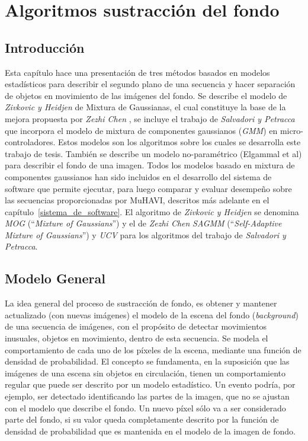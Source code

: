 \chapter{Algoritmos sustracción del fondo}\label{chap:algoritmos}

\section{Introducción}


Esta capítulo hace una presentación de tres métodos basados en modelos estadísticos para describir el segundo plano de una secuencia y hacer separación de objetos en movimiento de las imágenes del fondo. Se describe el modelo de \textit{Zivkovic y Heidjen} \cite{zivkovic_efficient_2006} de Mixtura de Gaussianas, el cual constituye la base de la mejora propuesta por \textit{Zezhi Chen} \cite{chen_vehicle_2012}, se incluye el trabajo de \textit{Salvadori y Petracca} \cite{salvadori_gaussian_2012} que incorpora el modelo de mixtura de componentes gaussianos (\textit{GMM}) en micro-controladores. Estos modelos son los algoritmos sobre los cuales se desarrolla este trabajo de tesis. También se describe un modelo no-paramétrico (Elgammal et al\cite{elgammal_nonparametricmodel_2000}) para describir el fondo de una imagen. Todos los modelos basado en mixtura de componentes gaussianos han sido incluidos en el desarrollo del sistema de software que permite ejecutar, para luego  comparar y evaluar desempeño sobre las secuencias proporcionadas por MuHAVI, descritos más adelante en el capítulo~\ref{sistema_de_software}. El algoritmo de \textit{Zivkovic y Heidjen} se denomina \textit{MOG} (``\textit{Mixture of Gaussians}'') y el de \textit{Zezhi Chen} \textit{SAGMM} (``\textit{Self-Adaptive Mixture of Gaussians}'') y \textit{UCV} para los algoritmos del trabajo de \textit{Salvadori y Petracca}. 




\section{Modelo General}

La idea general del proceso de sustracción de fondo, es obtener y mantener actualizado (con nuevas imágenes) el modelo de la escena del fondo (\textit{background}) de una secuencia de imágenes, con el propósito de detectar movimientos inusuales, objetos en movimiento, dentro de esta secuencia. Se modela el comportamiento de cada uno de los píxeles de la escena, mediante una función de densidad de probabilidad. El concepto se fundamenta, en la suposición que las imágenes de una escena sin objetos en circulación, tienen un comportamiento regular que puede ser descrito por un modelo estadístico. Un evento podría, por ejemplo, ser detectado identificando las partes de la imagen, que no se ajustan con el modelo que describe el fondo. Un nuevo píxel sólo va a ser considerado parte del fondo, si su valor queda completamente descrito por la función de densidad de probabilidad que es mantenida en el modelo de la imagen de fondo. 


